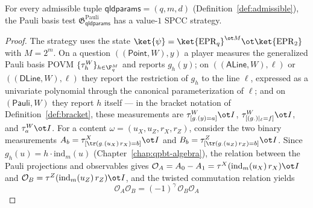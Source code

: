 \begin{lemma}\label{lem:pauli-completeness}
	\leanok
	For every admissible tuple $\mathsf{qldparams} = (q,m,d)$ (Definition~\ref{def:admissible}), the Pauli basis test $\mathfrak{G}^{\mathrm{Pauli}}_{\mathsf{qldparams}}$ has a value-$1$ SPCC strategy.
\end{lemma}
\begin{proof}
	\leanok
	The strategy uses the state $\ket{\psi} = \ket{\mathrm{EPR}_q}^{\ot M} \ot \ket{\mathrm{EPR}_2}$ with $M = 2^m$. On a question $((\mathsf{Point},W), y)$ a player measures the generalized Pauli basis POVM $\{\tau^W_h\}_{h \in \F_q^M}$ and reports $g_h(y)$; on $((\mathsf{ALine},W), \ell)$ or $((\mathsf{DLine},W), \ell)$ they report the restriction of $g_h$ to the line $\ell$, expressed as a univariate polynomial through the canonical parameterization of $\ell$; and on $(\mathsf{Pauli},W)$ they report $h$ itself --- in the bracket notation of Definition~\ref{def:bracket}, these measurements are $\tau^W_{[g_\cdot(y) = a]} \ot I$, $\tau^W_{[(g_\cdot)|_\ell = f]} \ot I$, and $\tau^W_a \ot I$. For a content $\omega = (u_X, u_Z, r_X, r_Z)$, consider the two binary measurements $A_b = \tau^X_{[\tr(g_\cdot(u_X)\, r_X) = b]} \ot I$ and $B_b = \tau^Z_{[\tr(g_\cdot(u_Z)\, r_Z) = b]} \ot I$. Since $g_h(u) = h \cdot \mathrm{ind}_m(u)$ (Chapter~\ref{chap:qpbt-algebra}), the relation between the Pauli projections and observables gives $\mathcal O_A = A_0 - A_1 = \tau^X(\mathrm{ind}_m(u_X)\, r_X) \ot I$ and $\mathcal O_B = \tau^Z(\mathrm{ind}_m(u_Z)\, r_Z) \ot I$, and the twisted commutation relation yields
	\[
		\mathcal O_A \mathcal O_B = (-1)^\gamma\, \mathcal O_B \mathcal O_A
	\]

\end{proof}
